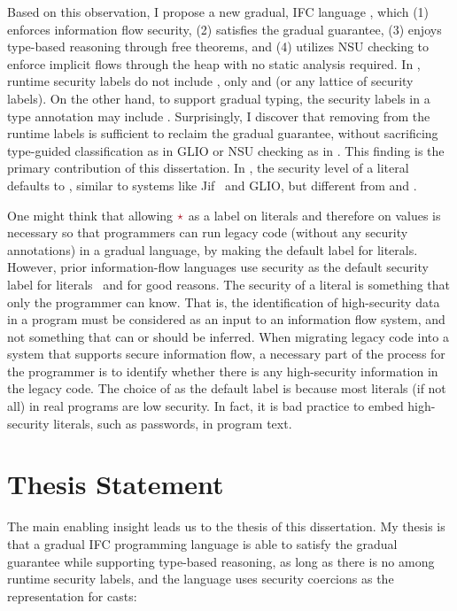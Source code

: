 Based on this observation, I propose a new gradual, IFC language \Surface, which
(1) enforces information flow security, (2) satisfies the gradual guarantee, (3)
enjoys type-based reasoning through free theorems, and (4) utilizes NSU checking
to enforce implicit flows through the heap with no static analysis required. In
\Surface, runtime security labels do not include \unk, only \low and \high (or
any lattice of security labels). On the other hand, to support gradual typing,
the security labels in a type annotation may include \unk. Surprisingly, I
discover that removing \unk from the runtime labels is sufficient to reclaim the
gradual guarantee, without sacrificing type-guided classification as in GLIO or
NSU checking as in \WHILEG. This finding is the primary contribution of this
dissertation. In \Surface, the security level of a literal defaults to \low,
similar to systems like Jif~\parencite{Myers:2006aa} and GLIO, but different
from \GSLRef and \WHILEG.

One might think that allowing $\unk$ as a label on literals and therefore on
values is necessary so that programmers can run legacy code (without any
security annotations) in a gradual language, by making \unk the default label
for literals. However, prior information-flow languages use \low security as the
default security label for literals~\parencite{Myers:2006aa} and for good
reasons. The security of a literal is something that only the programmer can
know. That is, the identification of high-security data in a program must be
considered as an input to an information flow system, and not something that can
or should be inferred. When migrating legacy code into a system that supports
secure information flow, a necessary part of the process for the programmer is
to identify whether there is any high-security information in the legacy code.
The choice of \low as the default label is because most literals (if not all) in
real programs are low security. In fact, it is bad practice to embed
high-security literals, such as passwords, in program text.

\section{Thesis Statement}

{\color{NavyBlue} %
The main enabling insight leads us to the thesis of this dissertation. My thesis
is that a gradual IFC programming language is able to satisfy the gradual
guarantee while supporting type-based reasoning, as long as there is no \unk
among runtime security labels, and the language uses security coercions as the
representation for casts:

\vspace{20pt}
}%

